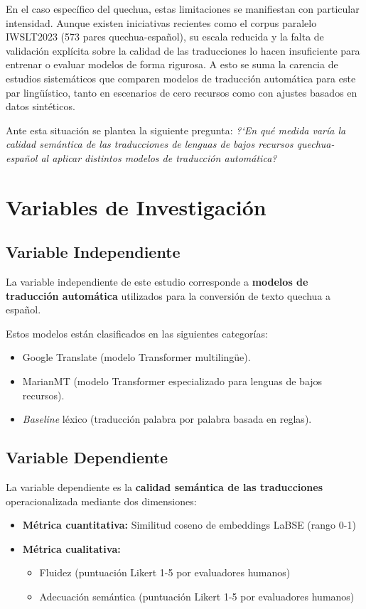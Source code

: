 En el caso específico del quechua, estas limitaciones se manifiestan con particular intensidad. Aunque existen iniciativas recientes como el corpus paralelo IWSLT2023 (573 pares quechua-español), su escala reducida y la falta de validación explícita sobre la calidad de las traducciones lo hacen insuficiente para entrenar o evaluar modelos de forma rigurosa. A esto se suma la carencia de estudios sistemáticos que comparen modelos de traducción automática para este par lingüístico, tanto en escenarios de cero recursos como con ajustes basados en datos sintéticos.

Ante esta situación se plantea la siguiente pregunta: \textit{?`En qué medida varía la calidad semántica de las traducciones de lenguas de bajos recursos quechua-español al aplicar distintos modelos de traducción automática?}

\section{Variables de Investigación}

\subsection{Variable Independiente}
La variable independiente de este estudio corresponde a \textbf{modelos de traducción automática} utilizados para la conversión de texto quechua a español.

Estos modelos están clasificados en las siguientes categorías:

\begin{itemize}
	\item Google Translate (modelo Transformer multilingüe).
	\item MarianMT (modelo Transformer especializado para lenguas de bajos recursos).
	\item \textit{Baseline} léxico (traducción palabra por palabra basada en reglas).
\end{itemize}


\subsection{Variable Dependiente}
La variable dependiente es la \textbf{calidad semántica de las traducciones} operacionalizada mediante dos dimensiones:

\begin{itemize}
	\item \textbf{Métrica cuantitativa:} Similitud coseno de embeddings LaBSE (rango 0-1)

	\item \textbf{Métrica cualitativa:}
	      \begin{itemize}
		      \item Fluidez (puntuación Likert 1-5 por evaluadores humanos)
		      \item Adecuación semántica (puntuación Likert 1-5 por evaluadores humanos)
	      \end{itemize}
\end{itemize}

